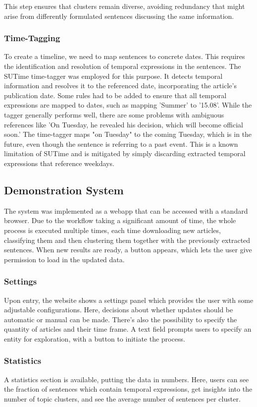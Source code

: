 \documentclass[sigconf]{acmart}
\begin{document}
This step ensures that clusters remain diverse, avoiding redundancy that might arise from differently formulated sentences discussing the same information.

\subsubsection{Time-Tagging}
To create a timeline, we need to map sentences to concrete dates. This requires the identification and resolution of temporal expressions in the sentences. The SUTime time-tagger \cite{sutime} was employed for this purpose. It detects temporal information and resolves it to the referenced date, incorporating the article's publication date.
Some rules had to be added to ensure that all temporal expressions are mapped to dates, such as mapping 'Summer' to '15.08'.
While the tagger generally performs well, there are some problems with ambiguous references like 'On Tuesday, he revealed his decision, which will become official soon.'
The time-tagger maps "on Tuesday" to the coming Tuesday, which is in the future, even though the sentence is referring to a past event. This is a known limitation of SUTime and is mitigated by simply discarding extracted temporal expressions that reference weekdays.

\subsection{Demonstration System}
The system was implemented as a webapp that can be accessed with a standard browser. Due to the workflow taking a significant amount of time, the whole process is executed multiple times, each time downloading new articles, classifying them and then clustering them together with the previously extracted sentences. When new results are ready, a button appears, which lets the user give permission to load in the updated data.

\subsubsection{Settings}
Upon entry, the website shows a settings panel which provides the user with some adjustable configurations. Here, decisions about whether updates should be automatic or manual can be made. There's also the possibility to specify the quantity of articles and their time frame. A text field prompts users to specify an entity for exploration, with a button to initiate the process.

\subsubsection{Statistics}
A statistics section is available, putting the data in numbers. Here, users can see the fraction of sentences which contain temporal expressions, get insights into the number of topic clusters, and see the average number of sentences per cluster.
\end{document}
